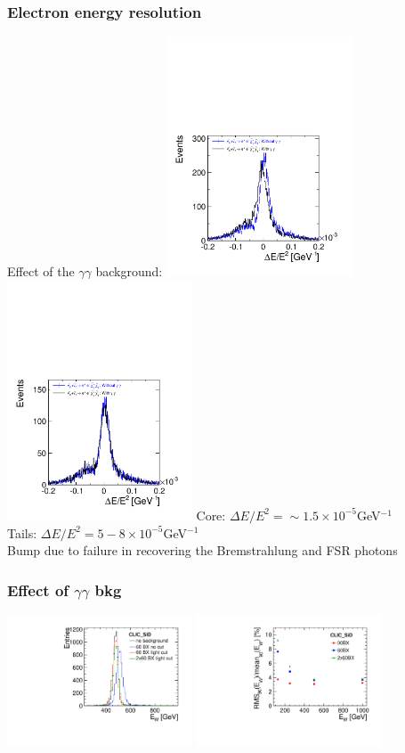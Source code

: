 \documentclass{beamer}
\begin{document}
\begin{frame}
\frametitle{Electron energy resolution}
Effect of the $\gamma\gamma$ background:
\includegraphics[width=5.5cm]{213_H1DPVOPV2A_BX060SEL1.pdf}
\includegraphics[width=5.5cm]{213_H1DPVOPV2A_BX060SEL4.pdf}
Core: $\Delta E/E^2=\sim 1.5 \times 10^{-5}$GeV$^{-1}$\\
Tails:  $\Delta E/E^2=5-8 \times 10^{-5}$GeV$^{-1}$\\
Bump due to failure in recovering the Bremstrahlung and FSR photons
\end{frame}
\begin{frame}
\frametitle{Effect of $\gamma\gamma$ bkg}
\includegraphics[width=5.5cm]{PFOSelComp_SID_E500_energy_ALL.pdf}
\includegraphics[width=5.5cm]{WW_Eres_SID.pdf}
\end{frame}
\end{document}
